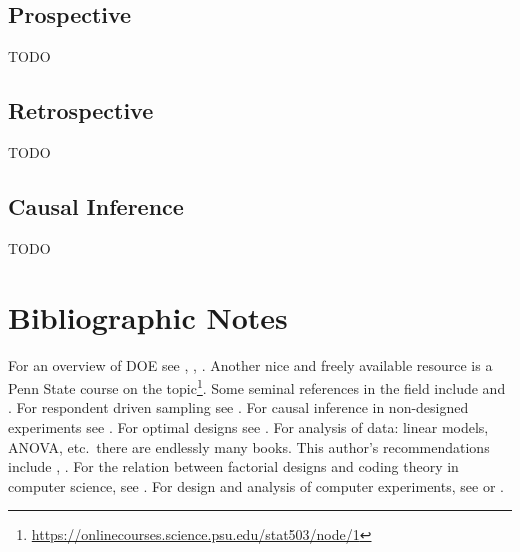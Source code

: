 \subsection{Prospective}
\label{sec:prospective}
TODO

\subsection{Retrospective}
\label{sec:restospective}
TODO


\subsection{Causal Inference}
\label{sec:causal}
TODO







\section{Bibliographic Notes}
For an overview of DOE see \cite{cox_theory_2000}, \cite{mason_statistical_2003}, \cite{everitt_cambridge_2010}. 
Another nice and freely available resource is a Penn State course on the topic\footnote{\url{https://onlinecourses.science.psu.edu/stat503/node/1}}. 
Some seminal references in the field include \cite{fisher_design_1960} and \cite{box_statistics_1978}.
For respondent driven sampling see \cite{berchenko_modeling_2013}.
For causal inference in non-designed experiments see \cite{rosenbaum_observational_2002}. 
For optimal designs see \cite{pukelsheim_optimal_1993}.
For analysis of data: linear models, ANOVA, etc.\ there are endlessly many books. This author's recommendations include \cite{hocking_analysis_1985}, \cite{greene_econometric_2003}. 
For the relation between factorial designs and coding theory in computer science, see \cite{hill_first_1986}. 
For design and analysis of computer experiments, see \cite{sacks_design_1989} or \cite{santner_design_2013}.

